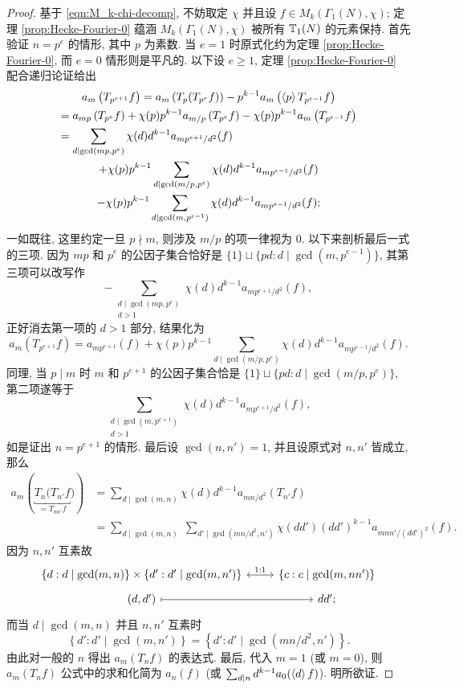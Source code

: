 \begin{proof}
	基于 \eqref{eqn:M_k-chi-decomp}, 不妨取定 $\chi$ 并且设 $f \in M_k(\Gamma_1(N), \chi)$; 定理 \ref{prop:Hecke-Fourier-0} 蕴涵 $M_k(\Gamma_1(N), \chi)$ 被所有 $\mathbb{T}_1(N)$ 的元素保持. 首先验证 $n=p^e$ 的情形, 其中 $p$ 为素数. 当 $e=1$ 时原式化约为定理 \ref{prop:Hecke-Fourier-0}, 而 $e=0$ 情形则是平凡的. 以下设 $e \geq 1$, 定理 \ref{prop:Hecke-Fourier-0} 配合递归论证给出
	\begin{multline*}
		a_m\left( T_{p^{e+1}} f \right) = a_m\left( T_p (T_{p^e} f)\right) - p^{k-1} a_m\left( \lrangle{p} T_{p^{e-1}} f \right) \\
		= a_{mp}\left( T_{p^e} f \right) + \chi(p) p^{k-1} a_{m/p}\left( T_{p^e} f \right) - \chi(p) p^{k-1} a_m\left( T_{p^{e-1}}f \right) \\
		= \sum_{d \mid \gcd(mp, p^e)} \chi(d) d^{k-1} a_{mp^{e+1}/d^2}(f) \hfill \\
		+ \chi(p)p^{k-1} \sum_{d \mid \gcd(m/p, p^e)} \chi(d) d^{k-1} a_{mp^{e-1}/d^2}(f) \\
		- \chi(p)p^{k-1} \sum_{d \mid \gcd(m, p^{e-1})} \chi(d) d^{k-1} a_{mp^{e-1}/d^2}(f);
	\end{multline*}
	一如既往, 这里约定一旦 $p \nmid m$, 则涉及 $m/p$ 的项一律视为 $0$. 以下来剖析最后一式的三项. 因为 $mp$ 和 $p^e$ 的公因子集合恰好是 $\{1\} \sqcup \{ pd : d \mid \gcd(m, p^{e-1}) \}$, 其第三项可以改写作
	\[ - \sum_{\substack{d \mid \gcd(mp,p^e) \\ d > 1}} \chi(d) d^{k-1} a_{mp^{e+1}/d^2}(f), \]
	正好消去第一项的 $d > 1$ 部分, 结果化为
	\[ a_m\left( T_{p^{e+1}} f \right) = a_{mp^{e+1}}(f) + \chi(p)p^{k-1} \sum_{d \mid \gcd(m/p, p^e)} \chi(d) d^{k-1} a_{mp^{e-1}/d^2}(f). \]
	同理, 当 $p \mid m$ 时 $m$ 和 $p^{e+1}$ 的公因子集合恰是 $\{1\} \sqcup \{ pd: d \mid \gcd(m/p, p^e) \}$, 第二项遂等于
	\[ \sum_{\substack{d \mid \gcd(m, p^{e+1}) \\ d > 1}} \chi(d) d^{k-1} a_{mp^{e+1}/d^2}(f), \]
	如是证出 $n = p^{e+1}$ 的情形. 最后设 $\gcd(n, n')=1$, 并且设原式对 $n,n'$ 皆成立, 那么
	\begin{align*}
		a_m \left( \underbracket{T_n (T_{n'} f}_{= T_{nn'} f} ) \right) & = \sum_{d \mid \gcd(m,n)} \chi(d) d^{k-1} a_{mn/d^2}(T_{n'} f) \\
		& = \sum_{d \mid \gcd(m,n)} \; \sum_{d' \mid \gcd(mn/d^2, n')} \chi(dd') (dd')^{k-1} a_{mnn'/(dd')^2}(f).
	\end{align*}
	因为 $n,n'$ 互素故
	\[\begin{tikzcd}[row sep=tiny]
		\left\{ d : d \mid \gcd(m, n) \right\} \times \left\{ d': d' \mid \gcd(m,n') \right\} \arrow[leftrightarrow, r, "1:1"] & \left\{ c: c \mid \gcd(m, nn') \right\} \\
		(d,d') \arrow[mapsto, r] & dd' ;
	\end{tikzcd}\]
	而当 $d \mid \gcd(m,n)$ 并且 $n, n'$ 互素时
	\[ \left\{ d': d' \mid \gcd(m,n') \right\} = \left\{ d': d' \mid \gcd(mn/d^2, n') \right\}. \]
	由此对一般的 $n$ 得出 $a_m(T_n f)$ 的表达式. 最后, 代入 $m=1$ (或 $m=0$), 则 $a_m(T_n f)$ 公式中的求和化简为 $a_n(f)$ (或 $\sum_{d \mid n} d^{k-1} a_0(\left\langle d \right\rangle f)$). 明所欲证.
\end{proof}

